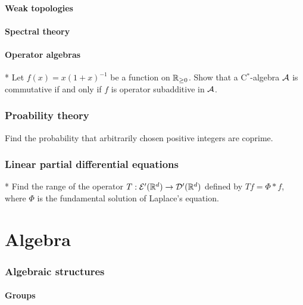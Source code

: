 \documentclass[11pt]{article}
\begin{document}
	\subsection{Weak topologies}
	\subsection{Spectral theory}
	\subsection{Operator algebras}
	\begin{prb}*
	Let $f(x)=x(1+x)^{-1}$ be a function on $\mathbb{R}_{\ge0}$.
	Show that a C$^*$-algebra $\mathcal{A}$ is commutative if and only if $f$ is operator subadditive in $\mathcal{A}$.
	\end{prb}

\section{Proability theory}

	\begin{prb}
	Find the probability that arbitrarily chosen positive integers are coprime.
	\end{prb}


\section{Linear partial differential equations}


	\begin{prb}*
	Find the range of the operator $T:\mathcal{E}'(\mathbb{R}^d)\to\mathcal{D}'(\mathbb{R}^d)$ defined by $Tf=\Phi*f$, where $\Phi$ is the fundamental solution of Laplace's equation.
	\end{prb}









\newpage
\part{Algebra}
\setcounter{section}{0}

\section{Algebraic structures}

	\subsection{Groups}
\end{document}
